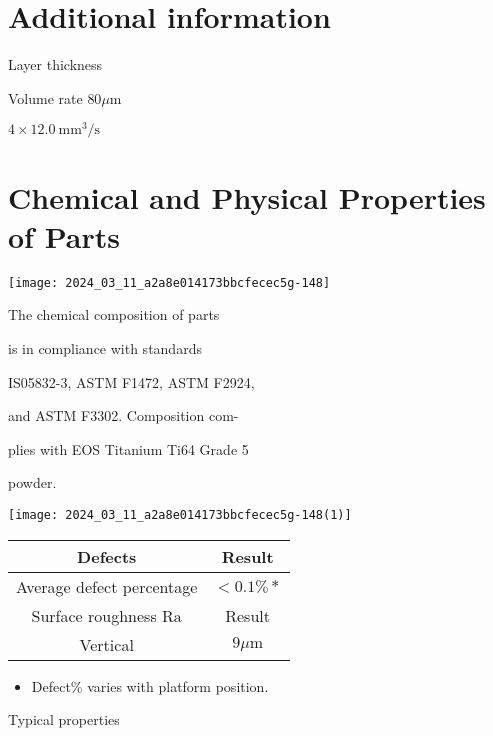 \documentclass[10pt]{article}
\begin{document}
\section*{Additional information}
Layer thickness

Volume rate $80 \mu \mathrm{m}$

$4 \times 12.0 \mathrm{~mm}^{3} / \mathrm{s}$

\section*{Chemical and Physical Properties of Parts}
\begin{center}
\texttt{[image: 2024\_03\_11\_a2a8e014173bbcfecec5g-148]}
\end{center}

The chemical composition of parts

is in compliance with standards

IS05832-3, ASTM F1472, ASTM F2924,

and ASTM F3302. Composition com-

plies with EOS Titanium Ti64 Grade 5

powder.

\begin{center}
\texttt{[image: 2024\_03\_11\_a2a8e014173bbcfecec5g-148(1)]}
\end{center}

\begin{center}
\begin{tabular}{|c|c|}
\hline
Defects & Result \\
\hline
Average defect percentage & $<0.1 \% *$ \\
\hline
Surface roughness $\mathrm{Ra}$ & Result \\
\hline
Vertical & $9 \mu \mathrm{m}$ \\
\hline
\end{tabular}
\end{center}

\begin{itemize}
  \item Defect\% varies with platform position.
\end{itemize}

Typical properties
\end{document}
